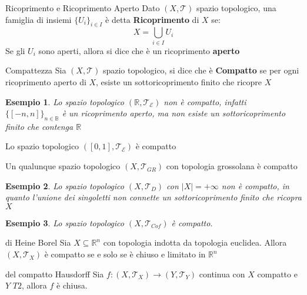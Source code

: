 \documentclass[11pt,a4paper,twoside]{article}
\newtheorem{es}{Esempio}
\theoremstyle{definition}
\begin{document}
\begin{defn}{Ricoprimento e Ricoprimento Aperto}{}
	Dato $(X, \mathcal T)$ spazio topologico, una famiglia di insiemi $\{U_i\}_{i \in I}$ è detta \textbf{Ricoprimento} di $X$ se:
	\[ X = \bigcup_{i \in I}U_i \]
	Se gli $U_i$ sono aperti, allora si dice che è un ricoprimento \textbf{aperto}
\end{defn}

\begin{defn}{Compattezza}{}
	Sia $(X, \mathcal T)$ spazio topologico, si dice che è \textbf{Compatto} se per ogni ricoprimento aperto di $X$, esiste un sottoricoprimento finito che ricopre $X$
\end{defn}

\begin{es}
	Lo spazio topologico $(\mathbb R, \mathcal T_\mathcal E)$ non è compatto, infatti $\{[-n,n]\}_{n \in \mathbb B}$ è un ricoprimento aperto, ma non esiste un sottoricoprimento finito che contenga $\mathbb R$
\end{es}

\begin{thm}{}{}
	Lo spazio topologico $([0,1], \mathcal T_\mathcal E)$ è compatto
\end{thm}

\begin{thm}{}{}
	Un qualunque spazio topologico $(X, \mathcal T_{GR})$ con topologia grossolana è compatto
\end{thm}

\begin{es}
	Lo spazio topologico $(X, \mathcal T_D)$ con $|X|= + \infty$ non è compatto, in quanto l'unione dei singoletti non connette un sottoricoprimento finito che ricopra $X$
\end{es}

\begin{es}
	Lo spazio topologico $(X, \mathcal T_{Cof})$ è compatto.
\end{es}

\begin{thm}{di Heine Borel}{}
	Sia $X \subseteq \mathbb R^n$ con topologia indotta da topologia euclidea. Allora $(X, \mathcal T_X)$ è compatto se e solo se è chiuso e limitato in $\mathbb R^n$
\end{thm}

\begin{thm}{del compatto Hausdorff}{}\label{housdorff}
	Sia $f:(X, \mathcal T_X) \to (Y, \mathcal T_Y)$ continua con $X$ compatto e $Y$ $T2$, allora $f$ è chiusa.
\end{thm}
\end{document}
